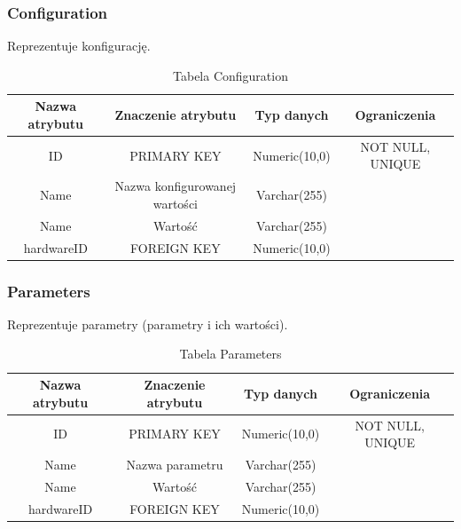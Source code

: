 \subsubsection{Configuration}
Reprezentuje konfigurację.
\begin{table}[H]
	\renewcommand\arraystretch{1.5}
	\renewcommand\tabcolsep{3pt}
	\begin{tabular}{| c | c | c | c |} 
		\hline \textbf{Nazwa atrybutu} & \textbf{Znaczenie atrybutu} & \textbf{Typ danych} & \textbf{Ograniczenia} \\ 
		\hline ID & PRIMARY KEY & Numeric(10,0) & NOT NULL, UNIQUE \\ 
		\hline Name & Nazwa konfigurowanej wartości & Varchar(255) &  \\ 
		\hline Name & Wartość & Varchar(255) &  \\
		\hline hardwareID & FOREIGN KEY & Numeric(10,0) & \\ 
		\hline 
	\end{tabular} 
	\caption{Tabela Configuration}
	\label{TAB:Configuration}
\end{table}

\subsubsection{Parameters}
Reprezentuje parametry (parametry i ich wartości).
\begin{table}[H]
	\renewcommand\arraystretch{1.5}
	\renewcommand\tabcolsep{3pt}
	\begin{tabular}{| c | c | c | c |} 
		\hline \textbf{Nazwa atrybutu} & \textbf{Znaczenie atrybutu} & \textbf{Typ danych} & \textbf{Ograniczenia} \\ 
		\hline ID & PRIMARY KEY & Numeric(10,0) & NOT NULL, UNIQUE \\ 
		\hline Name & Nazwa parametru & Varchar(255) &  \\ 
		\hline Name & Wartość & Varchar(255) &  \\
		\hline hardwareID & FOREIGN KEY & Numeric(10,0) & \\ 
		\hline 
	\end{tabular} 
	\caption{Tabela Parameters}
	\label{TAB:Parameters}
\end{table}

